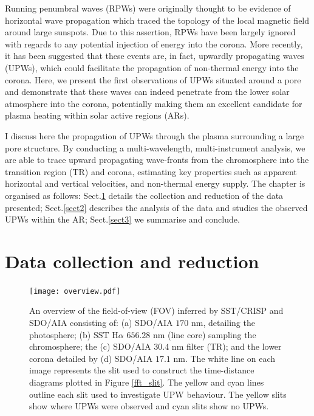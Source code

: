 	Running penumbral waves (RPWs) were originally thought to be evidence of horizontal wave propagation\citep{Zirin1972,Giovanelli1972,Bloomfiel2008} which traced the topology of the local magnetic field \citep{Zhugzhda1973,Nye1974} around large sunspots.
	Due to this assertion, RPWs have been largely ignored with regards to any potential injection of energy into the corona.
	More recently, it has been suggested that these events are, in fact, upwardly propagating waves (UPWs)\citep{OASO,Bloomfiel2008,Jess2013}, which could facilitate the propagation of non-thermal energy into the corona.
	Here, we present the first observations of UPWs situated around a pore and demonstrate that these waves can indeed penetrate from the lower solar atmosphere into the corona, potentially making them an excellent candidate for plasma heating within solar active regions (ARs).

	I discuss here the propagation of UPWs through the plasma surrounding a large pore structure.
	By conducting a multi-wavelength, multi-instrument analysis, we are able to trace upward propagating wave-fronts from the chromosphere into the transition region (TR) and corona, estimating key properties such as apparent horizontal and vertical velocities, and non-thermal energy supply.
	The chapter is organised as follows: Sect.\ref{sect1} details the collection and reduction of the data presented; Sect.\ref{sect2} describes the analysis of the data and studies the observed UPWs within the AR; Sect.\ref{sect3} we summarise and conclude.

\section{Data collection and reduction}
\label{sect1}

	\begin{figure}
		\centering
		\texttt{[image: overview.pdf]}
		\caption
		{
		An overview of the field-of-view (FOV) inferred by SST/CRISP and SDO/AIA consisting of:
		(a) SDO/AIA $170$ nm, detailing the photosphere; (b) SST H$\alpha$ $656.28$ nm (line core) sampling the chromosphere; the  (c) SDO/AIA $30.4$ nm filter (TR); and the lower corona detailed by (d) SDO/AIA $17.1$ nm.
		The white line on each image represents the slit used to construct the time-distance diagrams plotted in Figure \ref{fft_slit}.
		The yellow and cyan lines outline each slit used to investigate UPW behaviour.
	    The yellow slits show where UPWs were observed and cyan slits show no UPWs.
		}
		\label{chap5:overview}
	\end{figure}

